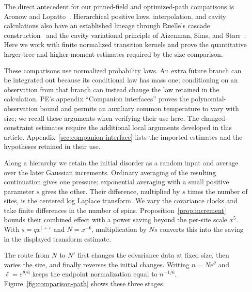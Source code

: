 The direct antecedent for our pinned-field and optimized-path
comparisons is Aronow and Lopatto~\cite{AL2026}. Hierarchical positive
laws, interpolation, and cavity calculations also have an established
lineage through Ruelle's cascade construction~\cite{Ruelle1987} and
the cavity variational principle of Aizenman, Sims, and
Starr~\cite{AizenmanSimsStarr2003}. Here we work with finite normalized
transition kernels and prove the quantitative larger-tree and
higher-moment estimates required by the size comparison.

These comparisons use normalized probability laws. An extra future
branch can be integrated out because its conditional law has mass one;
conditioning on an observation from that branch can instead change the
law retained in the calculation. PE's appendix ``Companion interfaces''
proves the polynomial-observation bound and permits an auxiliary common
temperature to vary with size; we recall these arguments when verifying
their use here. The changed-constraint estimates require the additional
local arguments developed in this article.
Appendix~\ref{sec:companion-interface} lists the imported estimates
and the hypotheses retained in their use.

Along a hierarchy we retain the initial disorder as a random input
and average over the later Gaussian increments. Ordinary averaging of
the resulting continuation gives one pressure; exponential averaging
with a small positive parameter $s$ gives the other. Their difference,
multiplied by $s$ times the number of sites, is the centered log Laplace
transform. We vary the covariance clocks and take finite differences
in the number of spins. Proposition~\ref{prop:increment} bounds their
combined effect with a power saving beyond the per-site scale $x^5$.
With $s=q x^{1+\varepsilon}$ and $N=x^{-6}$, multiplication by $Ns$
converts this into the saving in the displayed transform estimate.

The route from $N$ to $N'$ first changes the covariance data at fixed
size, then varies the size, and finally reverses the initial changes.
Writing $n=N e^\theta$ and $\ell=e^{\theta/6}$ keeps the endpoint
normalization equal to $n^{-1/6}$. Figure~\ref{fig:comparison-path}
shows these three stages.



